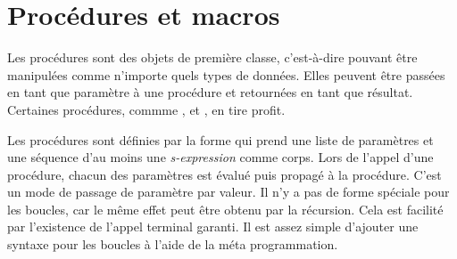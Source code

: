 \section{Procédures et macros}
\label{sec:proc_and_macro}

Les procédures sont des objets de première classe, c'est-à-dire pouvant
être manipulées comme n'importe quels types de données. Elles peuvent
être passées en tant que paramètre à une procédure et retournées en tant que
résultat.  Certaines procédures, commme ,  et
, en tire profit.

Les procédures sont définies par la forme  qui prend une liste
de paramètres et une séquence d'au moins une \textit{s-expression} comme corps.
Lors de l'appel d'une procédure, chacun des paramètres est évalué puis propagé
à la procédure. C'est un mode de passage de paramètre par valeur. Il n'y a pas
de forme spéciale pour les boucles, car le même effet peut être obtenu par la
récursion.  Cela est facilité par l'existence de l'appel terminal garanti.  Il
est assez simple d'ajouter une syntaxe pour les boucles à l'aide de la méta
programmation.







